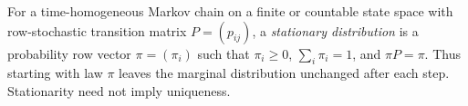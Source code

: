 
For a time-homogeneous Markov chain on a finite or countable state space with row-stochastic transition matrix $P=(p_{ij})$, a \emph{stationary distribution} is a probability row vector $\pi=(\pi_i)$ such that $\pi_i\ge0$, $\sum_i\pi_i=1$, and $\pi P=\pi$. Thus starting with law $\pi$ leaves the marginal distribution unchanged after each step. Stationarity need not imply uniqueness.
